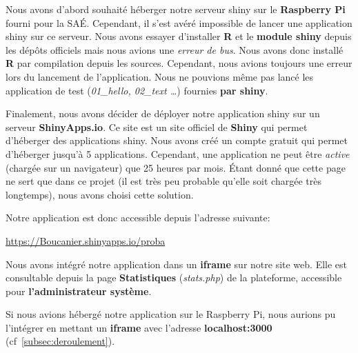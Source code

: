 \documentclass[12pt, a4paper]{article}
\begin{document}
Nous avons d'abord souhaité héberger notre serveur shiny sur le \textbf{Raspberry Pi} fourni pour la SAÉ.
Cependant, il s'est avéré impossible de lancer une application shiny sur ce serveur.
Nous avons essayer d'installer \textbf{R} et le \textbf{module shiny} depuis les dépôts officiels mais nous avions une \textit{erreur de bus}.
Nous avons donc installé \textbf{R} par compilation depuis les sources.
Cependant, nous avions toujours une erreur lors du lancement de l'application.
Nous ne pouvions même pas lancé les application de test (\textit{01\_hello, 02\_text \ldots}) fournies \textbf{par shiny}.
\bigskip

Finalement, nous avons décider de déployer notre application shiny sur un serveur \textbf{ShinyApps.io}.
Ce site est un site officiel de \textbf{Shiny} qui permet d'héberger des applications shiny.
Nous avons créé un compte gratuit qui permet d'héberger jusqu'à 5 applications.
Cependant, une application ne peut être \textit{active} (chargée sur un navigateur) que 25 heures par mois.
Étant donné que cette page ne sert que dans ce projet (il est très peu probable qu'elle soit chargée très longtemps),
nous avons choisi cette solution.
\bigskip

\noindent Notre application est donc accessible depuis l'adresse suivante:
\begin{center}
    \url{https://Boucanier.shinyapps.io/proba}
\end{center}

\noindent Nous avons intégré notre application dans un \textbf{iframe} sur notre site web.
Elle est consultable depuis la page \textbf{Statistiques} (\textit{stats.php}) de la plateforme,
accessible pour \textbf{l'administrateur système}.

\bigskip
Si nous avions hébergé notre application sur le Raspberry Pi,
nous aurions pu l'intégrer en mettant un \textbf{iframe} avec l'adresse \textbf{localhost\string:3000} (cf~\ref{subsec:deroulement}).
\end{document}
